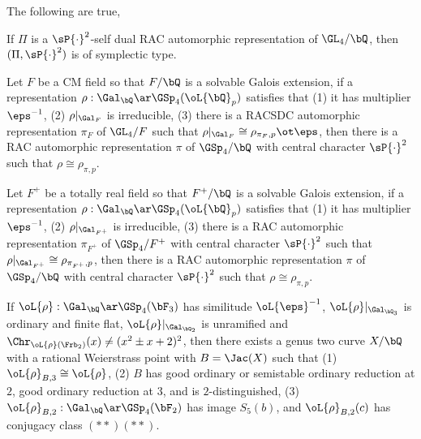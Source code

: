 \documentclass[article, a4paper, twoside]{universal}
\begin{document}
\begin{thm}\label{thm:solvable}
    The following are true,
    \begin{itm}
        \item If $\Pi$ is a $\sP{\cdot}^{2}$-self dual RAC automorphic representation of $\GL_{4}/\bQ$, then $(\Pi,\sP{\cdot}^{2})$ is of symplectic type.
        \item Let $F$ be a CM field so that $F/\bQ$ is a solvable Galois extension, if a representation $\rho:\Gal_{\bQ}\ar\GSp_{4}(\oL{\bQ}_{p})$ satisfies that (1) it has multiplier $\eps^{-1}$, (2) $\rho|_{\Gal_{F}}$ is irreducible, (3) there is a RACSDC automorphic representation $\pi_{F}$ of $\GL_{4}/F$ such that $\rho|_{\Gal_{F}}\cong\rho_{\pi_{F},p}\ot\eps$, then there is a RAC automorphic representation $\pi$ of $\GSp_{4}/\bQ$ with central character $\sP{\cdot}^{2}$ such that $\rho\cong\rho_{\pi,p}$.
        \item Let $F^{+}$ be a totally real field so that $F^{+}/\bQ$ is a solvable Galois extension, if a representation $\rho:\Gal_{\bQ}\ar\GSp_{4}(\oL{\bQ}_{p})$ satisfies that (1) it has multiplier $\eps^{-1}$, (2) $\rho|_{\Gal_{F^{+}}}$ is irreducible, (3) there is a RAC automorphic representation $\pi_{F^{+}}$ of $\GSp_{4}/F^{+}$ with central character $\sP{\cdot}^{2}$ such that $\rho|_{\Gal_{F^{+}}}\cong\rho_{\pi_{F^{+}},p}$, then there is a RAC automorphic representation $\pi$ of $\GSp_{4}/\bQ$ with central character $\sP{\cdot}^{2}$ such that $\rho\cong\rho_{\pi,p}$.
    \end{itm}
\end{thm}


\begin{thm}\label{thm:2-3-switch}
    If $\oL{\rho}:\Gal_{\bQ}\ar\GSp_{4}(\bF_{3})$ has similitude $\oL{\eps}^{-1}$, $\oL{\rho}|_{\Gal_{\bQ_{3}}}$ is ordinary and finite flat, $\oL{\rho}|_{\Gal_{\bQ_{2}}}$ is unramified and $\Chr_{\oL{\rho}(\Frb_{2})}(x)\neq(x^{2}\pm x +2)^{2}$, then there exists a genus two curve $X/\bQ$ with a rational Weierstrass point with $B=\Jac(X)$ such that (1) $\oL{\rho}_{B,3}\cong\oL{\rho}$, (2) $B$ has good ordinary or semistable ordinary reduction at $2$, good ordinary reduction at $3$, and is $2$-distinguished, (3) $\oL{\rho}_{B,2}:\Gal_{\bQ}\ar\GSp_{4}(\bF_{2})$ has image $S_{5}(b)$, and $\oL{\rho}_{B,2}(c)$ has conjugacy class $(**)(**)$.
\end{thm}
\end{document}
